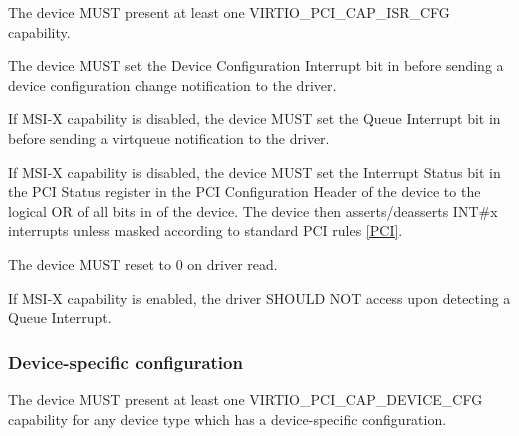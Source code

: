 
The device MUST present at least one VIRTIO_PCI_CAP_ISR_CFG capability.

The device MUST set the Device Configuration Interrupt bit
in  before sending a device configuration
change notification to the driver.

If MSI-X capability is disabled, the device MUST set the Queue
Interrupt bit in  before sending a virtqueue
notification to the driver.

If MSI-X capability is disabled, the device MUST set the Interrupt Status
bit in the PCI Status register in the PCI Configuration Header of
the device to the logical OR of all bits in  of
the device.  The device then asserts/deasserts INT\#x interrupts unless masked
according to standard PCI rules \hyperref[intro:PCI]{[PCI]}.

The device MUST reset  to 0 on driver read.


If MSI-X capability is enabled, the driver SHOULD NOT access
 upon detecting a Queue Interrupt.

\subsubsection{Device-specific configuration}\label{sec:Virtio Transport Options / Virtio Over PCI Bus / PCI Device Layout / Device-specific configuration}

The device MUST present at least one VIRTIO_PCI_CAP_DEVICE_CFG capability for
any device type which has a device-specific configuration.


